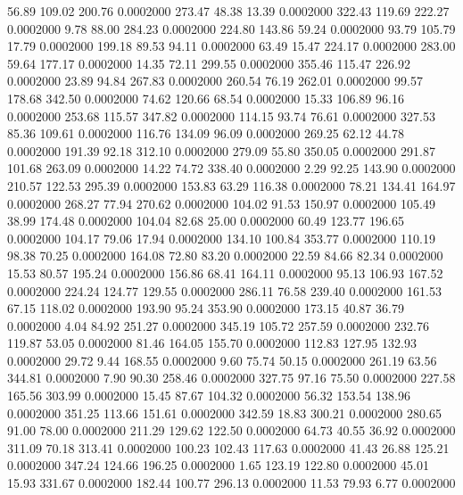  56.89  109.02  200.76   0.0002000
 273.47   48.38   13.39   0.0002000
 322.43  119.69  222.27   0.0002000
   9.78   88.00  284.23   0.0002000
 224.80  143.86   59.24   0.0002000
  93.79  105.79   17.79   0.0002000
 199.18   89.53   94.11   0.0002000
  63.49   15.47  224.17   0.0002000
 283.00   59.64  177.17   0.0002000
  14.35   72.11  299.55   0.0002000
 355.46  115.47  226.92   0.0002000
  23.89   94.84  267.83   0.0002000
 260.54   76.19  262.01   0.0002000
  99.57  178.68  342.50   0.0002000
  74.62  120.66   68.54   0.0002000
  15.33  106.89   96.16   0.0002000
 253.68  115.57  347.82   0.0002000
 114.15   93.74   76.61   0.0002000
 327.53   85.36  109.61   0.0002000
 116.76  134.09   96.09   0.0002000
 269.25   62.12   44.78   0.0002000
 191.39   92.18  312.10   0.0002000
 279.09   55.80  350.05   0.0002000
 291.87  101.68  263.09   0.0002000
  14.22   74.72  338.40   0.0002000
   2.29   92.25  143.90   0.0002000
 210.57  122.53  295.39   0.0002000
 153.83   63.29  116.38   0.0002000
  78.21  134.41  164.97   0.0002000
 268.27   77.94  270.62   0.0002000
 104.02   91.53  150.97   0.0002000
 105.49   38.99  174.48   0.0002000
 104.04   82.68   25.00   0.0002000
  60.49  123.77  196.65   0.0002000
 104.17   79.06   17.94   0.0002000
 134.10  100.84  353.77   0.0002000
 110.19   98.38   70.25   0.0002000
 164.08   72.80   83.20   0.0002000
  22.59   84.66   82.34   0.0002000
  15.53   80.57  195.24   0.0002000
 156.86   68.41  164.11   0.0002000
  95.13  106.93  167.52   0.0002000
 224.24  124.77  129.55   0.0002000
 286.11   76.58  239.40   0.0002000
 161.53   67.15  118.02   0.0002000
 193.90   95.24  353.90   0.0002000
 173.15   40.87   36.79   0.0002000
   4.04   84.92  251.27   0.0002000
 345.19  105.72  257.59   0.0002000
 232.76  119.87   53.05   0.0002000
  81.46  164.05  155.70   0.0002000
 112.83  127.95  132.93   0.0002000
  29.72    9.44  168.55   0.0002000
   9.60   75.74   50.15   0.0002000
 261.19   63.56  344.81   0.0002000
   7.90   90.30  258.46   0.0002000
 327.75   97.16   75.50   0.0002000
 227.58  165.56  303.99   0.0002000
  15.45   87.67  104.32   0.0002000
  56.32  153.54  138.96   0.0002000
 351.25  113.66  151.61   0.0002000
 342.59   18.83  300.21   0.0002000
 280.65   91.00   78.00   0.0002000
 211.29  129.62  122.50   0.0002000
  64.73   40.55   36.92   0.0002000
 311.09   70.18  313.41   0.0002000
 100.23  102.43  117.63   0.0002000
  41.43   26.88  125.21   0.0002000
 347.24  124.66  196.25   0.0002000
   1.65  123.19  122.80   0.0002000
  45.01   15.93  331.67   0.0002000
 182.44  100.77  296.13   0.0002000
  11.53   79.93    6.77   0.0002000
